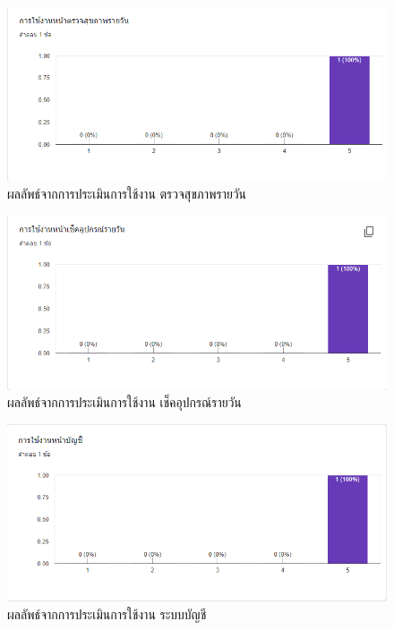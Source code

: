 \begin{figure}
  \begin{center}
    \includegraphics[width=\linewidth]{images/eval5.png}
  \end{center}
  \caption[ผลลัพธ์จากการประเมินการใช้งาน ตรวจสุขภาพรายวัน]{ผลลัพธ์จากการประเมินการใช้งาน ตรวจสุขภาพรายวัน}
  \label{fig:Eval5}
\end{figure}

\begin{figure}
  \begin{center}
    \includegraphics[width=\linewidth]{images/eval6.png}
  \end{center}
  \caption[ผลลัพธ์จากการประเมินการใช้งาน เช็คอุปกรณ์รายวัน]{ผลลัพธ์จากการประเมินการใช้งาน เช็คอุปกรณ์รายวัน}
  \label{fig:Eval6}
\end{figure}

\begin{figure}
  \begin{center}
    \includegraphics[width=\linewidth]{images/eval7.png}
  \end{center}
  \caption[ผลลัพธ์จากการประเมินการใช้งาน ระบบบัญชี]{ผลลัพธ์จากการประเมินการใช้งาน ระบบบัญชี}
  \label{fig:Eval7}
\end{figure}

